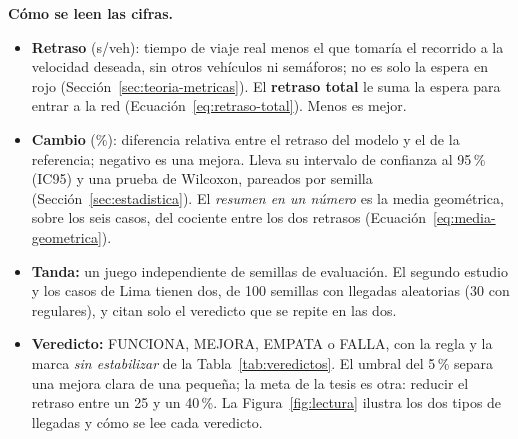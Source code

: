 \noindent\textbf{Cómo se leen las cifras.}
\begin{itemize}
  \item \textbf{Retraso} (s/veh): tiempo de viaje real menos el que
    tomaría el recorrido a la velocidad deseada, sin otros vehículos ni
    semáforos; no es solo la espera en rojo
    (Sección~\ref{sec:teoria-metricas}). El \textbf{retraso total} le
    suma la espera para entrar a la red
    (Ecuación~\ref{eq:retraso-total}). Menos es mejor.
  \item \textbf{Cambio} (\%): diferencia relativa entre el retraso del
    modelo y el de la referencia; negativo es una mejora. Lleva su
    intervalo de confianza al 95\,\% (IC95) y una prueba de Wilcoxon,
    pareados por semilla (Sección~\ref{sec:estadistica}). El
    \emph{resumen en un número} es la media geométrica, sobre los seis
    casos, del cociente entre los dos retrasos
    (Ecuación~\ref{eq:media-geometrica}).
  \item \textbf{Tanda:} un juego independiente de semillas de
    evaluación. El segundo estudio y los casos de Lima tienen dos, de
    100 semillas con llegadas aleatorias (30 con regulares), y citan solo
    el veredicto que se repite en las dos.
  \item \textbf{Veredicto:} FUNCIONA, MEJORA, EMPATA o FALLA, con la
    regla y la marca \emph{sin estabilizar} de la
    Tabla~\ref{tab:veredictos}. El umbral del 5\,\% separa una mejora
    clara de una pequeña; la meta de la tesis es otra: reducir el retraso
    entre un 25 y un 40\,\%. La Figura~\ref{fig:lectura} ilustra los dos
    tipos de llegadas y cómo se lee cada veredicto.
\end{itemize}

